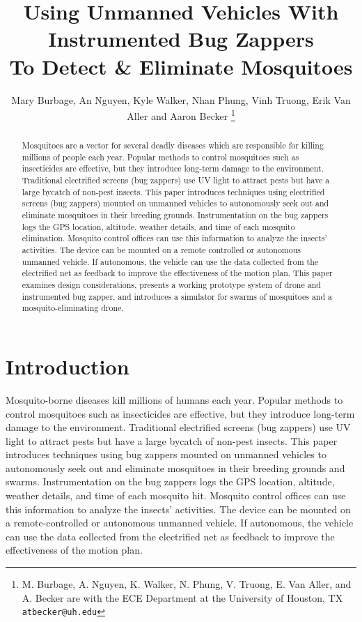 \documentclass[letterpaper, 10 pt, conference]{ieeeconf}  %
\title{\LARGE \bf
Using Unmanned Vehicles With Instrumented Bug Zappers\\ To Detect \& Eliminate Mosquitoes
}
\author{Mary Burbage, An Nguyen, Kyle Walker, Nhan Phung, Vinh Truong, Erik Van Aller and Aaron Becker%
\thanks{M. Burbage, A. Nguyen, K. Walker, N. Phung, V. Truong, E. Van Aller, and A. Becker are with the ECE Department at the University of Houston, TX
        {\tt\small atbecker@uh.edu}}%
}
\begin{document}
\maketitle
\thispagestyle{empty}
\pagestyle{empty}


\begin{abstract}
Mosquitoes are a vector for several deadly diseases which are responsible for killing millions of people each year.  Popular methods to control mosquitoes such as insecticides are effective, but they introduce long-term damage to the environment. Traditional electrified screens (bug zappers) use UV light to attract pests but have a large bycatch of non-pest insects. This paper introduces techniques using electrified screens (bug zappers) mounted on unmanned vehicles to autonomously seek out and eliminate mosquitoes in their breeding grounds. Instrumentation on the bug zappers logs the GPS location, altitude, weather details, and time of each mosquito elimination. Mosquito control offices can use this information to analyze the insects' activities. The device can be mounted on a remote controlled or autonomous unmanned vehicle. If autonomous, the vehicle can use the data collected from the electrified net as feedback to improve the effectiveness of the motion plan. 
This paper examines design considerations, presents a working prototype system of drone and instrumented bug zapper, and introduces a simulator for swarms of mosquitoes and a mosquito-eliminating drone.  
\end{abstract}


\section{Introduction}

Mosquito-borne diseases kill millions of humans each year. Popular methods to control mosquitoes such as insecticides are effective, but they introduce long-term damage to the environment. Traditional electrified screens (bug zappers) use UV light to attract pests but have a large bycatch of non-pest insects. This paper introduces techniques using bug zappers mounted on unmanned vehicles to autonomously seek out and eliminate mosquitoes in their breeding grounds and swarms. Instrumentation on the bug zappers logs the GPS location, altitude, weather details, and time of each mosquito hit.  Mosquito control offices can use this information to analyze the insects' activities. The device can be mounted on a remote-controlled or autonomous unmanned vehicle. If autonomous, the vehicle can use the data collected from the electrified net as feedback to improve the effectiveness of the motion plan. 
\end{document}
